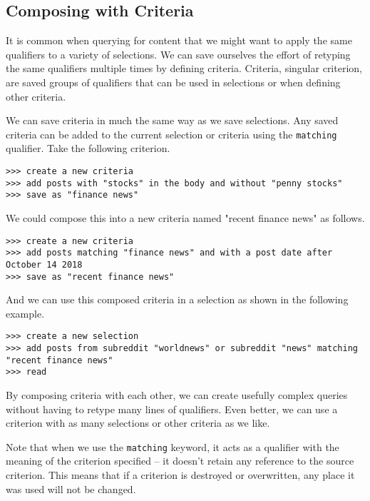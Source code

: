 \subsection{Composing with Criteria}
It is common when querying for content that we might want to apply the same qualifiers to a
variety of selections. We can save ourselves the effort of retyping the same qualifiers multiple
times by defining criteria. Criteria, singular criterion, are saved groups of qualifiers that
can be used in selections or when defining other criteria.

We can save criteria in much the same way as we save selections. Any saved criteria can be
added to the current selection or criteria using the \texttt{matching} qualifier. Take the following criterion.
\newline\begin{minipage}{\linewidth}\begin{lstlisting}
>>> create a new criteria
>>> add posts with "stocks" in the body and without "penny stocks"
>>> save as "finance news"
\end{lstlisting}\end{minipage}
We could compose this into a new criteria named "recent finance news" as follows.
\newline\begin{minipage}{\linewidth}\begin{lstlisting}
>>> create a new criteria
>>> add posts matching "finance news" and with a post date after October 14 2018
>>> save as "recent finance news"
\end{lstlisting}\end{minipage}
And we can use this composed criteria in a selection as shown in the following example.
\newline\begin{minipage}{\linewidth}\begin{lstlisting}
>>> create a new selection
>>> add posts from subreddit "worldnews" or subreddit "news" matching "recent finance news"
>>> read
\end{lstlisting}\end{minipage}
By composing criteria with each other, we can create usefully complex queries without having
to retype many lines of qualifiers. Even better, we can use a criterion with as many selections or other criteria as we like.

Note that when we use the \texttt{matching} keyword, it acts as a qualifier with the meaning of the
criterion specified -- it doesn’t retain any reference to the source criterion. This means
that if a criterion is destroyed or overwritten, any place it was used will not be changed.

